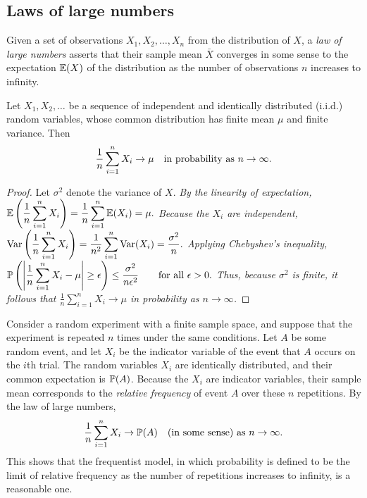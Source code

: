 \subsection{Laws of large numbers}
Given a set of observations $X_1,X_2,\ldots,X_n$ from the distribution of $X$, a \emph{law of large numbers} asserts that their sample mean $\bar{X}$ converges in some sense to the expectation $\mathbb{E}(X)$ of the distribution as the number of observations $n$ increases to infinity.

\begin{theorem}\label{thm:wlln}
Let $X_1,X_2,\ldots$ be a sequence of independent and identically distributed (i.i.d.) random variables, whose common distribution has finite mean $\mu$ and finite variance. Then
\[
\frac{1}{n}\sum_{i=1}^n X_i \to \mu \text{\quad in probability as\ } n\to\infty.
\]
\end{theorem}
\begin{proof}
Let $\sigma^2$ denote the variance of $X$.
\bit
\it 
By the linearity of expectation,
$\displaystyle\mathbb{E}\left(\frac{1}{n}\sum_{i=1}^n X_i\right)	= \frac{1}{n}\sum_{i=1}^n \mathbb{E}(X_i)= \mu.$
\it
Because the $X_i$ are independent,
$\displaystyle\text{Var}\left(\frac{1}{n}\sum_{i=1}^n X_i\right)	= \frac{1}{n^2}\sum_{i=1}^n \text{Var}(X_i) = \frac{\sigma^2}{n}.$
\it
Applying Chebyshev's inequality,
$\displaystyle\mathbb{P}\left(\left|\frac{1}{n}\sum_{i=1}^n X_i - \mu\right| \geq \epsilon\right) \leq \frac{\sigma^2}{n\epsilon^2} \qquad\text{for all $\epsilon>0$.}$
\eit
Thus, because $\sigma^2$ is finite, it follows that $\displaystyle\frac{1}{n}\sum_{i=1}^n X_i\to\mu$ in probability as $n\to\infty$.
\normalsize
\end{proof}


\begin{remark}
Consider a random experiment with a finite sample space, and suppose that the experiment is repeated $n$ times under the same conditions. Let $A$ be some random event, and let $X_i$ be the indicator variable of the event that $A$ occurs on the $i$th trial. The random variables $X_i$ are identically distributed, and their common expectation is $\mathbb{P}(A)$. Because the $X_i$ are indicator variables, their sample mean corresponds to the \emph{relative frequency} of event $A$ over these $n$ repetitions. By the law of large numbers,
\[
\frac{1}{n}\sum_{i=1}^n X_i \to \mathbb{P}(A) \quad\text{(in some sense) as $n\to\infty$.}
\]
This shows that the frequentist model, in which probability is defined to be the limit of relative frequency as the number of repetitions increases to infinity, is a reasonable one.
\end{remark}

